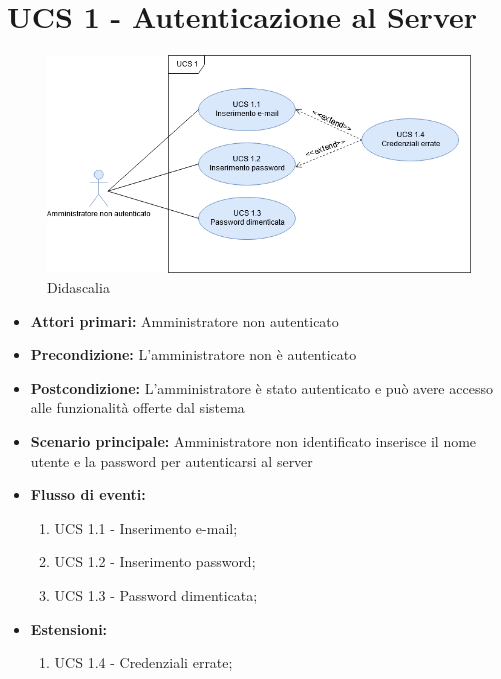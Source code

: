 


\section{UCS 1 - Autenticazione al Server}

\begin{figure}[h]
  \caption{Didascalia}
  \centering
    \includegraphics[scale=0.6]{sezioni/UseCase/Immagini/UCS1.png}
\end{figure}

\begin{itemize}
\item \textbf{Attori primari:} Amministratore non autenticato
\item \textbf{Precondizione:} L'amministratore non è autenticato
\item \textbf{Postcondizione:}  L'amministratore è stato autenticato e può avere accesso alle funzionalità offerte dal sistema
\item \textbf{Scenario principale:} Amministratore non identificato inserisce il nome utente e la password per autenticarsi al server 
\item \textbf{Flusso di eventi:}
    \begin{enumerate}
        \item UCS 1.1 - Inserimento e-mail;
        \item UCS 1.2 - Inserimento password;
        \item UCS 1.3 - Password dimenticata;
        
    \end{enumerate}
\item \textbf{Estensioni:}
	\begin{enumerate}		
		\item UCS 1.4 - Credenziali errate;
	\end{enumerate}
\end{itemize}


